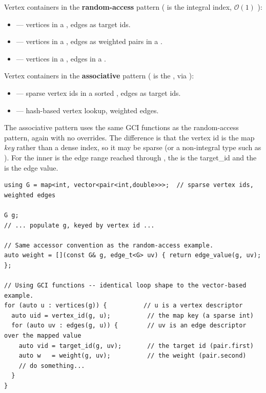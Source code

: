Vertex containers in the \textbf{random-access} pattern ( is the integral index,
$\mathcal{O}(1)$ ):
\begin{itemize}
    \item {} --- vertices in a , edges as  target ids.
    \item {} --- vertices in a , edges as weighted pairs in a .
    \item {} --- vertices in a , edges in a .
\end{itemize}

Vertex containers in the \textbf{associative} pattern ( is the ,
 via ):
\begin{itemize}
    \item {} --- sparse vertex ids in a sorted , edges as target ids.
    \item {} --- hash-based vertex lookup, weighted edges.
\end{itemize}

The associative pattern uses the same GCI functions as the random-access pattern, again with no overrides.
The difference is that the vertex id is the map \emph{key} rather than a dense index, so it may be sparse (or a
non-integral type such as ). For  the inner
 is the edge range reached through , the  is
the target\_id and the  is the edge value.

\begin{lstlisting}
using G = map<int, vector<pair<int,double>>>;  // sparse vertex ids, weighted edges

G g;
// ... populate g, keyed by vertex id ...

// Same accessor convention as the random-access example.
auto weight = [](const G& g, edge_t<G> uv) { return edge_value(g, uv); };

// Using GCI functions -- identical loop shape to the vector-based example.
for (auto u : vertices(g)) {          // u is a vertex descriptor
  auto uid = vertex_id(g, u);          // the map key (a sparse int)
  for (auto uv : edges(g, u)) {        // uv is an edge descriptor over the mapped value
    auto vid = target_id(g, uv);       // the target id (pair.first)
    auto w   = weight(g, uv);          // the weight (pair.second)
    // do something...
  }
}
\end{lstlisting}

